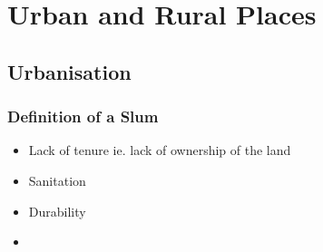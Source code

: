 \chapter{Urban and Rural Places}

\section{Urbanisation} \label{14/02/2025}
	\subsection{Definition of a Slum}
		\begin{itemize}
			\item Lack of tenure ie. lack of ownership of the land
			\item Sanitation
			\item Durability
			\item 
		\end{itemize}
	
